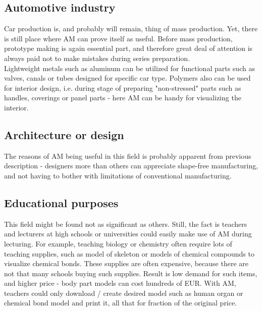 \documentclass[a4paper, twoside, 11pt]{report}
\begin{document}
\subsection{Automotive industry}
Car production is, and probably will remain, thing of mass production. Yet, there is still place where AM can prove itself as useful. Before mass production, prototype making is again essential part, and therefore great deal of attention is always paid not to make mistakes during series preparation.\\
Lightweight metals such as aluminum can be utilized for functional parts such as valves, canals or tubes designed for specific car type. Polymers also can be used for interior design, i.e. during stage of preparing "non-stressed" parts such as handles, coverings or panel parts - here AM can be handy for visualizing the interior.
\subsection{Architecture or design}
The reasons of AM being useful in this field is probably apparent from previous description - designers more than others can appreciate shape-free manufacturing, and not having to bother with limitations of conventional manufacturing. 
\subsection{Educational purposes}
This field might be found not as significant as others. Still, the fact is teachers and lecturers at high schools or universities could easily make use of AM during lecturing. For example, teaching biology or chemistry often require lots of teaching supplies, such as model of skeleton or models of chemical compounds to visualize chemical bonds. These supplies are often expensive, because there are not that many schools buying such supplies. Result is low demand for such items, and higher price - body part models can cost hundreds of EUR. With AM, teachers could only download / create desired model such as human organ or chemical bond model and print it, all that for fraction of the original price.
%
%
%
\end{document}
